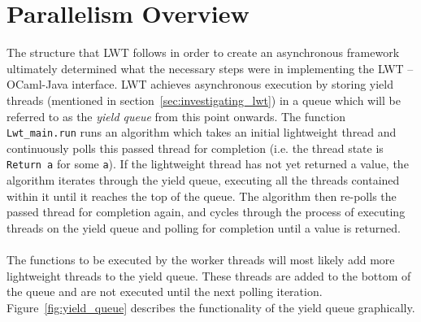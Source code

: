\documentclass[12pt,twoside,notitlepage]{report}
\begin{document}
\section{Parallelism Overview}
\label{sec:parallelism_overview}
%
%
The structure that LWT follows in order to create an asynchronous framework ultimately determined what the necessary steps were in implementing the LWT -- OCaml-Java interface. LWT achieves asynchronous execution by storing
yield threads (mentioned in section~\ref{sec:investigating_lwt}) in a queue which will be referred to as the {\em yield queue} from this point onwards. The function {\tt Lwt\_main.run} runs an algorithm which takes an initial
lightweight thread and
continuously polls this passed thread for completion (i.e. the thread state is {\tt Return a} for some {\tt a}). If the lightweight thread has not yet returned a value, the algorithm iterates through the yield queue, executing all the threads contained within it
until it reaches the top of the queue. The algorithm then re-polls the passed thread for completion again, and cycles through the process of executing threads on the yield queue and polling for completion until a value is returned. 
\hfill\\
\hfill\\
The functions to be executed by the worker threads will most likely add more lightweight threads to the yield queue. These threads are added to the bottom of the queue and are not executed until the next polling iteration.
Figure~\ref{fig:yield_queue} describes the functionality of the yield queue graphically.
\end{document}
